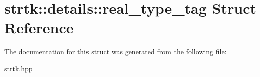 \hypertarget{structstrtk_1_1details_1_1real__type__tag}{\section{strtk\-:\-:details\-:\-:real\-\_\-type\-\_\-tag Struct Reference}
\label{structstrtk_1_1details_1_1real__type__tag}
}


The documentation for this struct was generated from the following file\-:\begin{DoxyCompactItemize}
\item 
strtk.\-hpp\end{DoxyCompactItemize}
